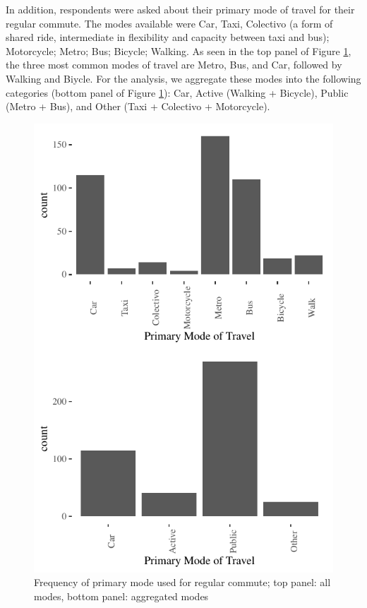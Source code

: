 \documentclass[]{elsarticle} %
\makeatletter
\def\maxwidth{\ifdim\Gin@nat@width>\linewidth\linewidth
\else\Gin@nat@width\fi}
\let\Oldincludegraphics\includegraphics
\renewcommand{\includegraphics}[1]{\Oldincludegraphics[width=\maxwidth]{#1}}
\makeatother
\begin{document}
In addition, respondents were asked about their primary mode of travel
for their regular commute. The modes available were Car, Taxi, Colectivo
(a form of shared ride, intermediate in flexibility and capacity between
taxi and bus); Motorcycle; Metro; Bus; Bicycle; Walking. As seen in the
top panel of Figure \ref{fig:primary-mode-travel}, the three most common
modes of travel are Metro, Bus, and Car, followed by Walking and Biycle.
For the analysis, we aggregate these modes into the following categories
(bottom panel of Figure \ref{fig:primary-mode-travel}): Car, Active
(Walking + Bicycle), Public (Metro + Bus), and Other (Taxi + Colectivo +
Motorcycle).

\begin{figure}
\centering
\includegraphics{Dissonance_Santiago_v1_files/figure-latex/figure-primary-mode-travel-1.pdf}
\caption{\label{fig:primary-mode-travel}Frequency of primary mode used
for regular commute; top panel: all modes, bottom panel: aggregated
modes}
\end{figure}
\end{document}
